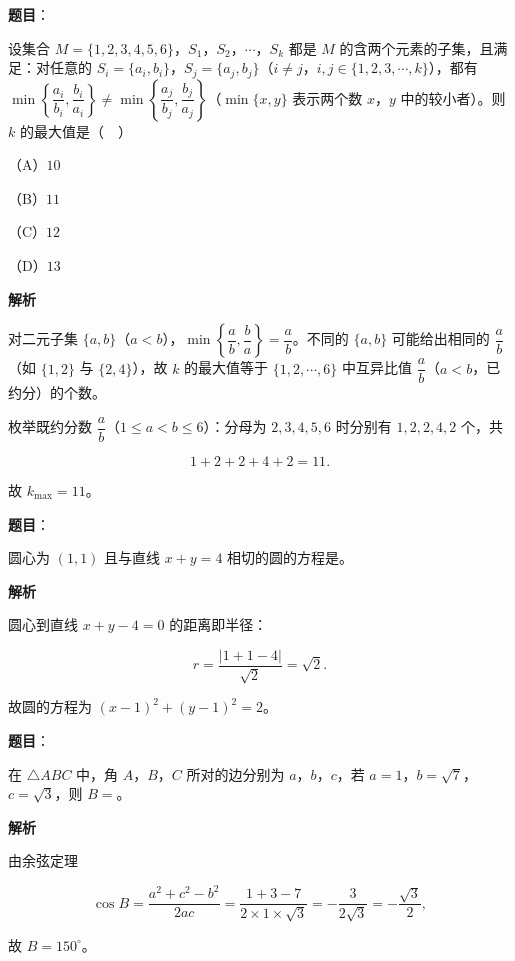\begin{answer}

\textbf{题目}：

设集合 $M=\{1,2,3,4,5,6\}$，$S_1$，$S_2$，$\cdots$，$S_k$ 都是 $M$ 的含两个元素的子集，且满足：对任意的 $S_i=\{a_i,b_i\}$，$S_j=\{a_j,b_j\}$（$i\neq j$，$i,j\in\{1,2,3,\cdots,k\}$），都有 $\min\left\{\dfrac{a_i}{b_i},\dfrac{b_i}{a_i}\right\}\neq\min\left\{\dfrac{a_j}{b_j},\dfrac{b_j}{a_j}\right\}$（$\min\{x,y\}$ 表示两个数 $x$，$y$ 中的较小者）。则 $k$ 的最大值是（　）

（A）$10$

（B）$11$

（C）$12$

（D）$13$

\textbf{解析}

对二元子集 $\{a,b\}$（$a<b$），$\min\left\{\dfrac ab,\dfrac ba\right\}=\dfrac ab$。不同的 $\{a,b\}$ 可能给出相同的 $\dfrac ab$（如 $\{1,2\}$ 与 $\{2,4\}$），故 $k$ 的最大值等于 $\{1,2,\cdots,6\}$ 中互异比值 $\dfrac ab$（$a<b$，已约分）的个数。

枚举既约分数 $\dfrac ab$（$1\leqslant a<b\leqslant6$）：分母为 $2,3,4,5,6$ 时分别有 $1,2,2,4,2$ 个，共

\nopagebreak[4]
\[1+2+2+4+2=11.\]

故 $k_{\max}=11$。


\end{answer}
\begin{answer}

\textbf{题目}：

圆心为 $(1,1)$ 且与直线 $x+y=4$ 相切的圆的方程是\gkblank{}。

\textbf{解析}

圆心到直线 $x+y-4=0$ 的距离即半径：

\nopagebreak[4]
\[r=\frac{|1+1-4|}{\sqrt2}=\sqrt2.\]

故圆的方程为 $(x-1)^2+(y-1)^2=2$。


\end{answer}
\begin{answer}

\textbf{题目}：

在 $\triangle ABC$ 中，角 $A$，$B$，$C$ 所对的边分别为 $a$，$b$，$c$，若 $a=1$，$b=\sqrt7$，$c=\sqrt3$，则 $B=$\gkblank{}。

\textbf{解析}

由余弦定理

\nopagebreak[4]
\[\cos B=\frac{a^2+c^2-b^2}{2ac}=\frac{1+3-7}{2\times1\times\sqrt3}=-\frac3{2\sqrt3}=-\frac{\sqrt3}2,\]

故 $B=150^\circ$。


\end{answer}
